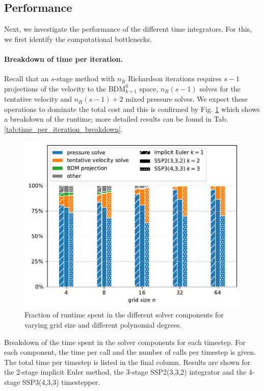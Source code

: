 \documentclass[11pt]{article}
\begin{document}
\subsection{Performance}
Next, we investigate the performance of the different time integrators. For this, we first identify the computational bottlenecks.
\paragraph{Breakdown of time per iteration.}
Recall that an $s$-stage method with $n_R$ Richardson iterations requires $s-1$ projections of the velocity to the $\text{BDM}_{k+1}^0$ space, $n_R(s-1)$ solves for the tentative velocity and $n_R(s-1)+2$ mixed pressure solves. We expect these operations to dominate the total cost and this is confirmed by Fig. \ref{fig:titer_breakdown} which shows a breakdown of the runtime; more detailed results can be found in Tab. \ref{tab:time_per_iteration_breakdown}.
\begin{figure}
    \begin{center}
        \includegraphics[width=0.75\linewidth]{figures/titer_breakdown.pdf}
        \caption{Fraction of runtime spent in the different solver components for varying grid size and different polynomial degrees.}
        \label{fig:titer_breakdown}
    \end{center}
\end{figure}
\begin{table}
    
    \begin{center}
        \caption{Breakdown of the time spent in the solver components for each timestep. For each component, the time per call and the number of calls per timestep is given. The total time per timestep is listed in the final column. Results are shown for the 2-stage implicit Euler method, the 3-stage SSP2(3,3,2) integrator and the 4-stage SSP3(4,3,3) timestepper.}
        \label{tab:time_per_iteration_breakdown}
    \end{center}
\end{table}
\end{document}
